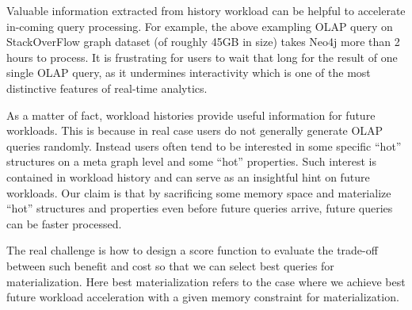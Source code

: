 Valuable information extracted from history workload can be helpful to accelerate in-coming query processing. For example, the above exampling OLAP query on StackOverFlow graph dataset (of roughly 45GB in size) takes Neo4j more than 2 hours to process. It is frustrating for users to wait that long for the result of one single OLAP query, as it undermines interactivity which is one of the most distinctive features of real-time analytics. %

As a matter of fact, workload histories provide useful information for future workloads. This is because in real case users do not generally generate OLAP queries randomly. Instead users often tend to be interested in some specific ``hot'' structures on a meta graph level and some ``hot'' properties. Such interest is contained in workload history and can serve as an insightful hint on future workloads. Our claim is that by sacrificing some memory space and materialize ``hot'' structures and properties even before future queries arrive, future queries can be faster processed.



The real challenge is how to design a score function to evaluate the trade-off  between such benefit and cost so that we can select best queries for materialization. Here best materialization refers to the case where we achieve best future workload acceleration with a given memory constraint for materialization.





